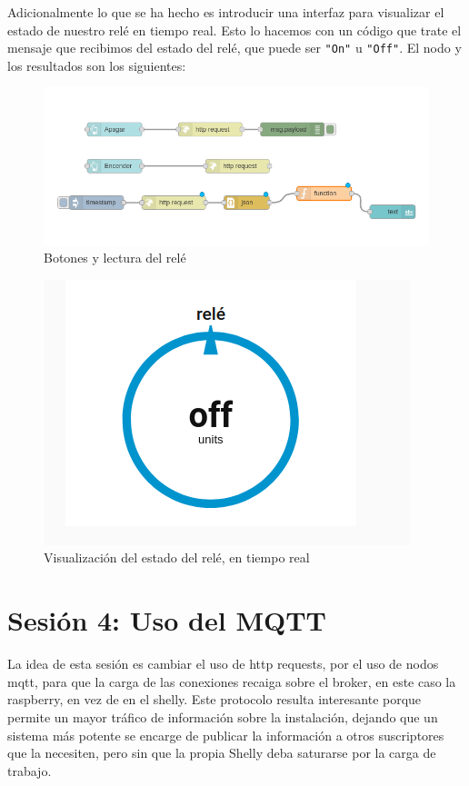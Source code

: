 \documentclass[12pt, a4paper]{article}
\begin{document}
Adicionalmente lo que se ha hecho es introducir una interfaz para visualizar el estado de nuestro relé en tiempo real. Esto lo 
hacemos con un código que trate el mensaje que recibimos del estado del relé, que puede ser \verb|"On"| u \verb|"Off"|. 
El nodo y los resultados son los siguientes:

\begin{figure}[H]
    \centering
    \includegraphics[scale=0.5]{botones_y_lectura.png}
    \caption{Botones y lectura del relé}
\end{figure}

\begin{figure}[H]
    \centering
    \includegraphics[scale=0.5]{dashboarestadorele.png}
    \caption{Visualización del estado del relé, en tiempo real}
\end{figure}

\section{Sesión 4: Uso del MQTT}

La idea de esta sesión es cambiar el uso de http requests, por 
el uso de nodos mqtt, para que la carga de las conexiones recaiga sobre
el broker, en este caso la raspberry, en vez de en el shelly. Este protocolo resulta interesante porque permite un
mayor tráfico de información sobre la instalación, dejando que un sistema más potente se encarge de publicar la información a 
otros suscriptores que la necesiten, pero sin que la propia Shelly deba saturarse por la carga de trabajo.
\end{document}
